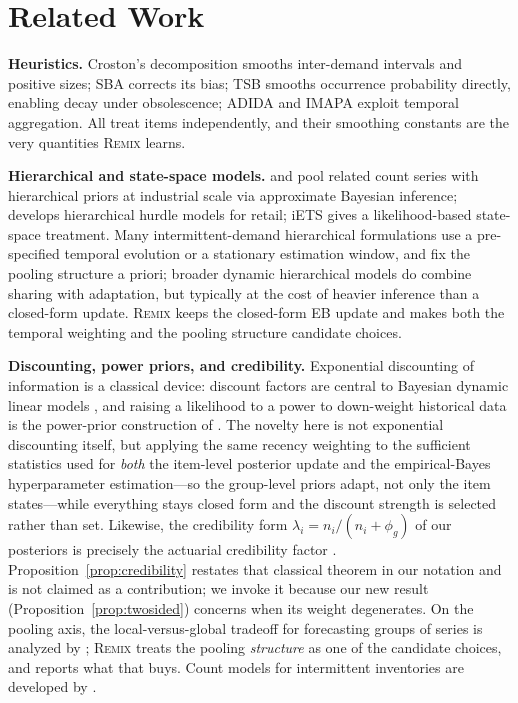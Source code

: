 \documentclass[twocolumn,10pt]{article}
\newcommand{\REMIX}{\textsc{Remix}}
\begin{document}
\section{Related Work}\label{sec:related}

\textbf{Heuristics.} Croston's decomposition \citep{croston1972} smooths
inter-demand intervals and positive sizes; SBA \citep{syntetos2005accuracy}
corrects its bias; TSB \citep{teunter2011} smooths occurrence probability
directly, enabling decay under obsolescence; ADIDA
\citep{nikolopoulos2011} and IMAPA \citep{kourentzes2016} exploit temporal
aggregation. All treat items independently, and their smoothing constants
are the very quantities \REMIX{} learns.

\textbf{Hierarchical and state-space models.} \citet{chapados2014} and
\citet{seeger2016} pool related count series with hierarchical priors at
industrial scale via approximate Bayesian inference; \citet{pitkin2024}
develops hierarchical hurdle models for retail; iETS
\citep{svetunkov2023iets} gives a likelihood-based state-space treatment.
Many intermittent-demand hierarchical formulations use a pre-specified
temporal evolution or a stationary estimation window, and fix the pooling
structure a priori; broader dynamic hierarchical models
\citep{westharrison1997} do combine sharing with adaptation, but typically
at the cost of heavier inference than a closed-form update. \REMIX{} keeps
the closed-form EB update and makes both the temporal weighting and the
pooling structure candidate choices.

\textbf{Discounting, power priors, and credibility.} Exponential
discounting of information is a classical device: discount factors are
central to Bayesian dynamic linear models \citep{westharrison1997}, and
raising a likelihood to a power to down-weight historical data is the
power-prior construction of \citet{ibrahimchen2000}. The novelty here is not exponential
discounting itself, but applying the same recency weighting to the
sufficient statistics used for \emph{both} the item-level posterior update
and the empirical-Bayes hyperparameter estimation---so the group-level
priors adapt, not only the item states---while everything stays closed
form and the discount strength is selected rather than set. Likewise, the credibility form
$\lambda_i=n_i/(n_i+\phi_g)$ of our posteriors is precisely the actuarial
credibility factor \citep{buhlmann1967}. Proposition~\ref{prop:credibility}
restates that classical theorem in our notation and is not claimed as a
contribution; we invoke it because our new result
(Proposition~\ref{prop:twosided}) concerns when its weight degenerates. On the pooling axis, the local-versus-global tradeoff for
forecasting groups of series is analyzed by
\citet{monteromanso2021}; \REMIX{} treats the pooling \emph{structure}
as one of the candidate choices, and reports what that buys. Count models for intermittent
inventories are developed by \citet{snyder2012}.
\end{document}
